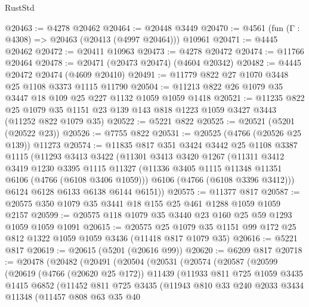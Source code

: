 \begin{lexlean}{RustStd}
\begin{coremodule}
@20463 := @4278 @20462
@20464 := @20448 @3449
@20470 := @4561 (fun (Γ : @4308) => @20463 (@20413 (@4997 @20464))) @10961
@20471 := @4445 @20462
@20472 := @20411 @10963
@20473 := @4278 @20472
@20474 := @11766 @20464
@20478 := @20471 (@20473 @20474) (@4604 @20342)
@20482 := @4445 @20472 @20474 (@4609 @20410)
@20491 := @11779 @822 @27 @1070 @3448 @25 @1108 @3373 @1115 @11790
@20504 := @11213 @822 @26 @1079 @35 @3447 @18 @109 @25 @227 @1132 @1059 @1059 @1418
@20521 := @11235
    @822
    @25
    @1079
    @35
    @1151
    @23
    @139
    @143
    @818
    @1223
    @1059
    @3427
    @3443
    (@11252 @822 @1079 @35)
@20522 := @5221 @822
@20525 := @20521 (@5201 (@20522 @23))
@20526 := @7755 @822
@20531 := @20525 (@4766 (@20526 @25 @139)) @11273
@20574 := @11835
    @817
    @351
    @3424
    @3442
    @25
    @1108
    @3387
    @1115
    (@11293
      @3413
      @3422
      (@11301
        @3413
        @3420
        @1267
        (@11311
          @3412
          @3419
          @1230
          @3395
          @1115
          @11327
          (@11336 @3405 @1115 @11348 @11351 @6106 (@4766 (@6108 @3406 @1059)))
          @6106
          (@4766 (@6108 @3396 @3412)))
        @6124
        @6128
        @6133
        @6138
        @6144
        @6151))
@20575 := @11377 @817
@20587 := @20575 @350 @1079 @35 @3441 @18 @155 @25 @461 @1288 @1059 @1059 @2157
@20599 := @20575 @118 @1079 @35 @3440 @23 @160 @25 @59 @1293 @1059 @1059 @1091
@20615 := @20575
    @25
    @1079
    @35
    @1151
    @99
    @172
    @25
    @812
    @1322
    @1059
    @1059
    @3436
    (@11418 @817 @1079 @35)
@20616 := @5221 @817
@20619 := @20615 (@5201 (@20616 @99))
@20620 := @6209 @817
@20718 := @20478
    (@20482
      (@20491
        (@20504
          (@20531
            (@20574
              (@20587
                (@20599
                  (@20619
                    (@4766 (@20620 @25 @172))
                    @11439
                    (@11933
                      @811
                      @725
                      @1059
                      @3435
                      @1415
                      @6852
                      (@11452
                        @811
                        @725
                        @3435
                        (@11943
                          @810
                          @33
                          @240
                          @2033
                          @3434
                          @11348
                          (@11457
                            @808
                            @63
                            @35
                            @40

\end{coremodule}
\end{lexlean}
